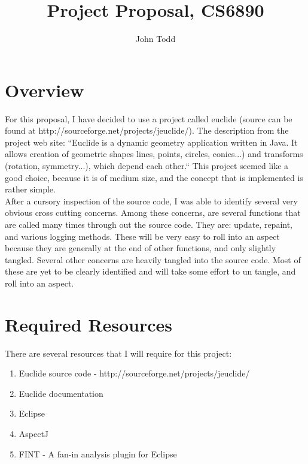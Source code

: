 \documentclass{article}
\begin{document}
\title{Project Proposal, CS6890}
\author{John Todd}

\maketitle

\section{Overview}

For this proposal, I have decided to use a project called euclide (source can be found at http://sourceforge.net/projects/jeuclide/). The description from the project web site: ``Euclide is a dynamic geometry application written in Java. It allows creation of geometric shapes lines, points, circles, conics...) and transforms (rotation, symmetry...), which depend each other.`` This project seemed like a good choice, because it is of medium size, and the concept that is implemented is rather simple. \\

After a cursory inspection of the source code, I was able to identify several very obvious cross cutting concerns.
 Among these concerns, are several functions that are called many times through out the source code. They are: update, repaint, and various logging 
 methods. These will be very easy to roll into an aspect because they are generally at the end of other functions, and only slightly tangled. 
 Several other concerns are heavily tangled into the source code. Most of these are yet to be clearly identified and  will take some effort to 
 un tangle, and roll into an aspect. \\


\section{Required Resources}
There are several resources that I will require for this project:
\begin{enumerate}

\item Euclide source code - http://sourceforge.net/projects/jeuclide/
\item Euclide documentation 
\item Eclipse
\item AspectJ
\item FINT - A fan-in analysis plugin for Eclipse

\end{enumerate}
\end{document}

